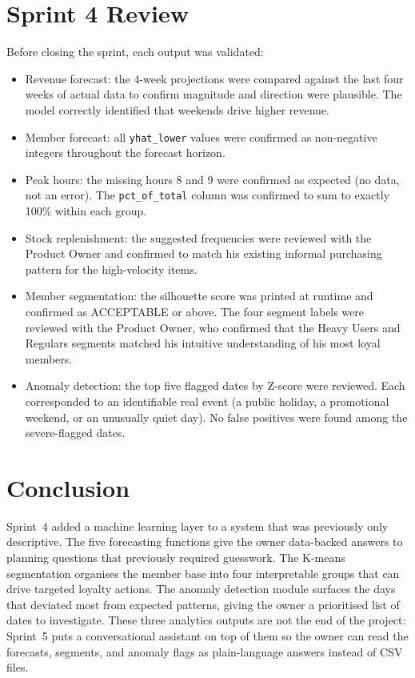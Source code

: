 \documentclass[12pt, a4paper]{report}
\begin{document}
\section{Sprint 4 Review}

Before closing the sprint, each output was validated:

\begin{itemize}
  \item Revenue forecast: the 4-week projections were compared against the last
        four weeks of actual data to confirm magnitude and direction were plausible.
        The model correctly identified that weekends drive higher revenue.
  \item Member forecast: all \texttt{yhat\_lower} values were confirmed as
        non-negative integers throughout the forecast horizon.
  \item Peak hours: the missing hours 8 and 9 were confirmed as expected
        (no data, not an error). The \texttt{pct\_of\_total} column was confirmed
        to sum to exactly 100\% within each group.
  \item Stock replenishment: the suggested frequencies were reviewed with the
        Product Owner and confirmed to match his existing informal purchasing
        pattern for the high-velocity items.
  \item Member segmentation: the silhouette score was printed at runtime and
        confirmed as ACCEPTABLE or above. The four segment labels were reviewed
        with the Product Owner, who confirmed that the Heavy Users and Regulars
        segments matched his intuitive understanding of his most loyal members.
  \item Anomaly detection: the top five flagged dates by Z-score were reviewed.
        Each corresponded to an identifiable real event (a public holiday, a
        promotional weekend, or an unusually quiet day). No false positives were
        found among the severe-flagged dates.
\end{itemize}

\section{Conclusion}

Sprint~4 added a machine learning layer to a system that was previously only
descriptive. The five forecasting functions give the owner data-backed answers to
planning questions that previously required guesswork. The K-means segmentation
organises the member base into four interpretable groups that can drive targeted
loyalty actions. The anomaly detection module surfaces the days that deviated most
from expected patterns, giving the owner a prioritised list of dates to investigate.
These three analytics outputs are not the end of the project: Sprint~5 puts a
conversational assistant on top of them so the owner can read the forecasts,
segments, and anomaly flags as plain-language answers instead of CSV files.
\end{document}
